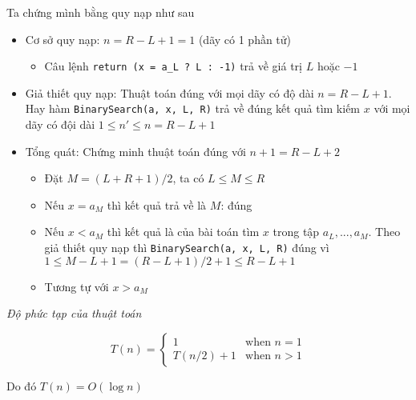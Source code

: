 Ta chứng mình bằng quy nạp như sau 
\begin{itemize}
    \item Cơ sở quy nạp: $n = R - L + 1 = 1$ (dãy có 1 phần tử)
    \begin{itemize}
        \item Câu lệnh \lstinline{return (x = a_L ? L : -1)} trả về giá trị $L$ hoặc $-1$
    \end{itemize}
    
    \item Giả thiết quy nạp: Thuật toán đúng với mọi dãy có độ dài $n = R-L+1$.
    Hay hàm \lstinline{BinarySearch(a, x, L, R)} trả về đúng kết quả tìm kiếm $x$ với mọi dãy
    có đội dài $1 \leq n' \leq n = R - L + 1$

    \item Tổng quát: Chứng minh thuật toán đúng với $n+1 = R-L+2$
    \begin{itemize}
        \item Đặt $M=(L+R+1)/2$, ta có $L \leq M \leq R$
        \item Nếu $x = a_M$ thì kết quả trả về là $M$: đúng
        \item Nếu $x < a_M$ thì kết quả là của bài toán tìm $x$ trong tập $a_L, ... , a_M$.
        Theo giả thiết quy nạp thì \lstinline{BinarySearch(a, x, L, R)} đúng vì 
        $1 \leq M - L + 1 = (R - L + 1)/2 + 1 \leq R - L + 1$
        \item Tương tự với $x > a_M$
    \end{itemize}
\end{itemize}

\textit{Độ phức tạp của thuật toán}

\begin{equation*}
    T(n) = 
    \begin{cases}
        1 & \text{when } n = 1 \\
        T(n/2) + 1 & \text{when } n > 1
    \end{cases}
\end{equation*}

Do đó $T(n) = O(\log n)$




